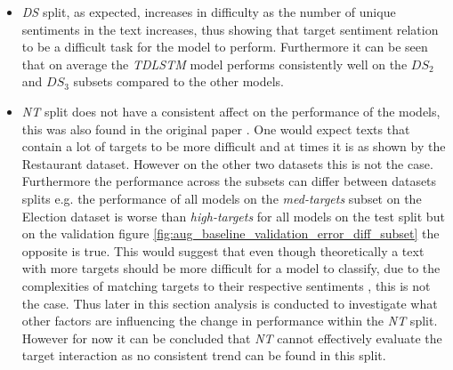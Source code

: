 \begin{itemize}
    \item \textit{DS} split, as expected, increases in difficulty as the number of unique sentiments in the text increases, thus showing that target sentiment relation to be a difficult task for the model to perform. Furthermore it can be seen that on average the \textit{TDLSTM} model performs consistently well on the $DS_2$ and $DS_3$ subsets compared to the other models.
    \item \textit{NT} split does not have a consistent affect on the performance of the models, this was also found in the original paper \citep{aug_zhang2019aspectbased}. One would expect texts that contain a lot of targets to be more difficult and at times it is as shown by the Restaurant dataset. However on the other two datasets this is not the case. Furthermore the performance across the subsets can differ between datasets splits e.g. the performance of all models on the \textit{med-targets} subset on the Election dataset is worse than \textit{high-targets} for all models on the test split but on the validation figure \ref{fig:aug_baseline_validation_error_diff_subset} the opposite is true. This would suggest that even though theoretically a text with more targets should be more difficult for a model to classify, due to the complexities of matching targets to their respective sentiments \citep{aug_zhang2019aspectbased}, this is not the case. Thus later in this section analysis is conducted to investigate what other factors are influencing the change in performance within the \textit{NT} split. However for now it can be concluded that \textit{NT} cannot effectively evaluate the target interaction as no consistent trend can be found in this split.

\end{itemize}
